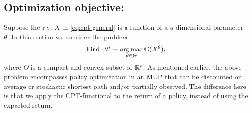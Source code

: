 \subsection{Optimization objective:} 
Suppose the r.v. $X$ in \eqref{eq:cpt-general} is a function of a $d$-dimensional parameter $\theta$. 
In this section we consider the problem 
\begin{align}
\label{eq:opt-general}
\textrm{Find ~}\theta^* = \mathop{\rm arg\,max}_{\theta \in \Theta} \mathbb{C}(X^\theta),
\end{align}
where $\Theta$ is a compact and convex subset of $\mathbb{R}^d$. As mentioned earlier, the above problem encompasses policy optimization in an MDP that can be discounted or average or stochastic shortest path and/or partially observed. The difference here is that we apply the CPT-functional to the return of a policy, instead of using the expected return.  

%

